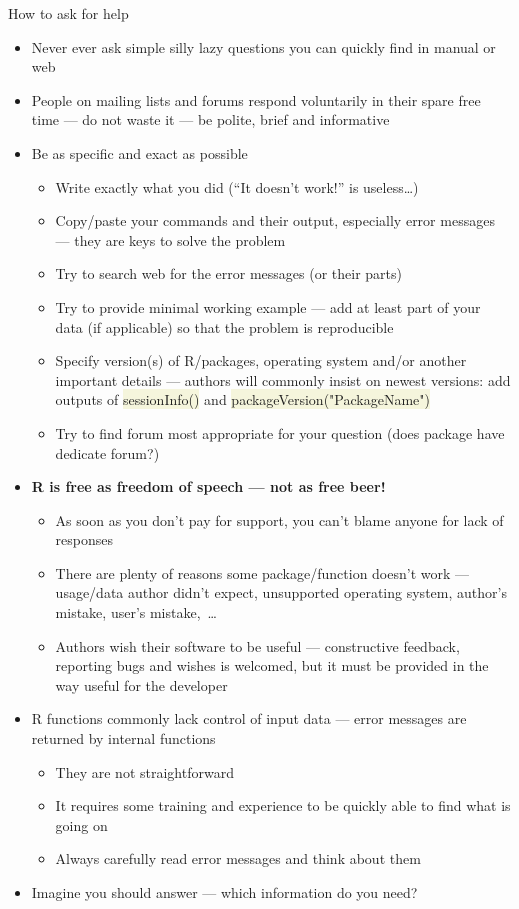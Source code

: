 \documentclass[compress, ucs, xelatex, 11pt, xcolor=svgnames, aspectratio=169,
	hyperref={
		bookmarks=true,
		unicode=true,
		colorlinks=true,
		pdftitle={Molecular data in R},
		plainpages=false,
		pdfauthor={Vojtech Zeisek},
		pdfsubject={Course about phylogeny and evolution in R},
		pdfcreator={XeLaTeX},
		pdfkeywords={R, evolution, phylogeny, molecular data},
		linkcolor=Crimson, %
		anchorcolor=Magenta, %
		citecolor=Magenta, %
		filecolor=Magenta, %
		menucolor=Magenta, %
		urlcolor=DodgerBlue, %
		pdftex},
	url={hyphens, lowtilde} %
	]{beamer}
\renewcommand{\texttt}[1]{\colorbox{Beige}{{\ttfamily #1}}}
\begin{document}
\begin{frame}[allowframebreaks]{How to ask for help}
	\label{howtoask}
	\begin{itemize}
		\item \alert{Never ever} ask simple silly lazy questions you can quickly find in manual or web
		\item People on mailing lists and forums respond voluntarily in their spare free time --- do not waste it --- be polite, brief and informative
		\item Be as specific and exact as possible
		\begin{itemize}
			\item Write \alert{exactly} what you did (\enquote{It doesn't work!} is useless\ldots)
			\item Copy/paste your commands and their output, especially error messages --- they are keys to solve the problem
			\item Try to search web for the error messages (or their parts)
			\item Try to provide minimal working example --- add at least part of your data (if applicable) so that the problem is reproducible
			\item Specify version(s) of R/packages, operating system and/or another important details --- authors will commonly insist on newest versions: add outputs of \texttt{sessionInfo()} and \texttt{packageVersion("PackageName")}
			\item Try to find forum most appropriate for your question (does package have dedicate forum?)
		\end{itemize}
		\item \textbf{R is free as freedom of speech --- not as free beer!}
		\begin{itemize}
			\item As soon as you don't pay for support, you can't blame anyone for lack of responses
			\item There are plenty of reasons some package/function doesn't work --- usage/data author didn't expect, unsupported operating system, author's mistake, user's mistake,~\ldots
			\item Authors wish their software to be useful --- constructive feedback, reporting bugs and wishes is welcomed, but it must be provided in the way useful for the developer
		\end{itemize}
		\item R functions commonly lack control of input data --- error messages are returned by internal functions
		\begin{itemize}
			\item They are not straightforward
			\item It requires some training and experience to be quickly able to find what is going on
			\item Always carefully read error messages and think about them
		\end{itemize}
		\item Imagine you should answer --- which information do you need?
	\end{itemize}
\end{frame}
\end{document}
